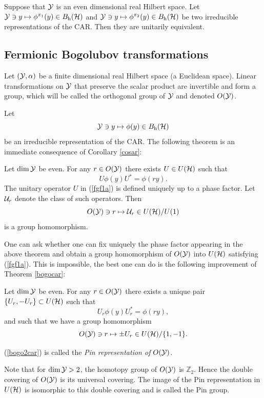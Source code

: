 \documentclass{svmult}
\newcommand{\beq}{\begin{equation}}
\newcommand{\eeq}{\end{equation}}
\def\bet{\begin{theorem}}
\def\eet{\end{theorem}}
\def\zz{{\mathbb Z}}
\def\h{{\rm h}}
\def\cY{{\cal Y}}
\def\cU{{\cal U}}
\def\cH{{\cal H}}
\def\cH{{\cal H}}
\begin{document}
\begin{corollary} Suppose that $\cY$ is an 
even dimensional real Hilbert space. Let
$\cY\ni y\mapsto \phi^{\pi_1}(y)\in B_\h(\cH)$ and
$\cY\ni y\mapsto \phi^{\pi_2}(y)\in B_\h(\cH)$ be two  irreducible
representations of the CAR. Then they are unitarily equivalent.
\label{cosar}
\end{corollary}



\subsection{Fermionic
Bogolubov transformations}

Let $(\cY,\alpha)$ be a finite dimensional real Hilbert space (a Euclidean
  space). 
Linear transformations on $\cY$
 that preserve the scalar product are invertible and 
 form a group, which will be called the orthogonal group of
$\cY$ and denoted $O(\cY)$.

Let
\beq
\cY\ni y\mapsto \phi(y)\in B_\h(\cH)
\label{iui4car}\eeq be an irreducible  
 representation of the CAR.
The following theorem is an immediate  consequence of Corollary \ref{cosar}:

\bet Let $\dim\cY$ be even.
For any $r\in O(\cY)$ there exists $U\in U(\cH)$ such that
\beq U \phi(y)U^*=\phi(ry).\label{fgf1a}\eeq
The unitary operator 
$U$ in (\ref{fgf1a}) is defined uniquely up to a phase factor. Let $\cU_r$
  denote the class of such 
operators. Then
\[O(\cY)\ni r\mapsto \cU_r\in  U(\cH)/U(1)\]
is a group homomorphism.
\label{bogocar}\eet

One can ask whether one can 
fix uniquely the phase factor appearing  in the above theorem
and obtain
a group homomorphism of $O(\cY)$ into $U(\cH)$ satisfying (\ref{fgf1a}). 
This is impossible, the best  one can do is
the following improvement of Theorem \ref{bogocar}:


\bet  Let $\dim\cY$ be even.
For any $r\in O(\cY)$ there exists a unique pair
$\{U_r,-U_r\}\subset U(\cH)$ such that
\[U_r \phi(y)U_r^*=\phi(ry),\]
and such that we have a group homomorphism
\beq O(\cY)\ni r\mapsto \pm U_r\in  U(\cH)/\{1,-1\}.\label{bogo2car}\eeq
\label{bogo1car}\eet

(\ref{bogo2car}) is called the {\em  Pin representation of $O(\cY)$}.


 Note that for $\dim\cY>2$, the
homotopy group of $O(\cY)$ is $\zz_2$. Hence the double covering of $O(\cY)$
is its universal covering.
The image of the Pin representation in $U(\cH)$ is isomorphic to this double
covering and is called the Pin group.
\end{document}
